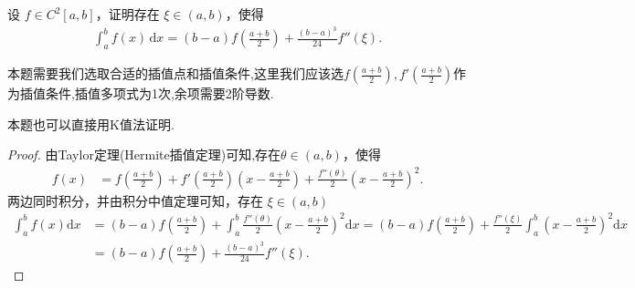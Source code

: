 \documentclass[../../main.tex]{subfiles}
\begin{document}
\begin{example}
设 $f \in C^2[a, b]$，证明存在 $\xi \in (a, b)$，使得
\begin{align*}
\int_a^b f(x) \, \mathrm{d}x = (b - a) f \left( \frac{a + b}{2} \right) + \frac{(b - a)^3}{24} f''(\xi).
\end{align*}
\end{example}
\begin{note}
本题需要我们选取合适的插值点和插值条件,这里我们应该选$f(\frac{a+b}{2}),f'(\frac{a+b}{2})$作为插值条件,插值多项式为1次,余项需要2阶导数.
\end{note}
\begin{remark}
本题也可以直接用K值法证明.
\end{remark}
\begin{proof}
由Taylor定理(Hermite插值定理)可知,存在$\theta \in \left( a,b \right)$，使得
\begin{align*}
f\left( x \right) &= f\left( \frac{a+b}{2} \right) + f'\left( \frac{a+b}{2} \right) \left( x - \frac{a+b}{2} \right) + \frac{f'' \left( \theta \right)}{2}\left( x - \frac{a+b}{2} \right)^2.
\end{align*}
两边同时积分，并由积分中值定理可知，存在 $\xi \in \left( a,b \right)$
\begin{align*}
\int_a^b{f\left( x \right) \mathrm{d}x} &= \left( b-a \right) f\left( \frac{a+b}{2} \right) + \int_a^b{\frac{f'' \left( \theta \right)}{2}\left( x - \frac{a+b}{2} \right)^2 \mathrm{d}x}
= \left( b-a \right) f\left( \frac{a+b}{2} \right) + \frac{f'' \left( \xi \right)}{2} \int_a^b{\left( x - \frac{a+b}{2} \right)^2 \mathrm{d}x} \\
&= \left( b-a \right) f\left( \frac{a+b}{2} \right) + \frac{\left( b-a \right)^3}{24} f'' \left( \xi \right).
\end{align*}
\end{proof}
\end{document}
